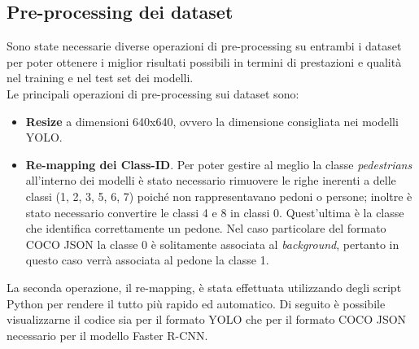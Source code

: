 \documentclass[12pt]{article}
\begin{document}
\subsection{Pre-processing dei dataset}
Sono state necessarie diverse operazioni di pre-processing su entrambi i dataset per poter ottenere i miglior risultati possibili in termini di prestazioni e qualità nel training e nel test set dei modelli.\\
Le principali operazioni di pre-processing sui dataset sono:
\begin{itemize}
    \item \textbf{Resize} a dimensioni 640x640, ovvero la dimensione consigliata nei modelli YOLO.
    \item \textbf{Re-mapping dei Class-ID}. Per poter gestire al meglio la classe \textit{pedestrians} all'interno dei modelli è stato necessario rimuovere le righe inerenti a delle classi (1, 2, 3, 5, 6, 7) poiché non rappresentavano pedoni o persone; inoltre è stato necessario convertire le classi 4 e 8 in classi 0. Quest'ultima è la classe che identifica correttamente un pedone. Nel caso particolare del formato COCO JSON la classe 0 è solitamente associata al \textit{background}, pertanto in questo caso verrà associata al pedone la classe 1. 
\end{itemize}
La seconda operazione, il re-mapping, è stata effettuata utilizzando degli script Python per rendere il tutto più rapido ed automatico. Di seguito è possibile visualizzarne il codice sia per il formato YOLO che per il formato COCO JSON necessario per il modello Faster R-CNN.
\end{document}

